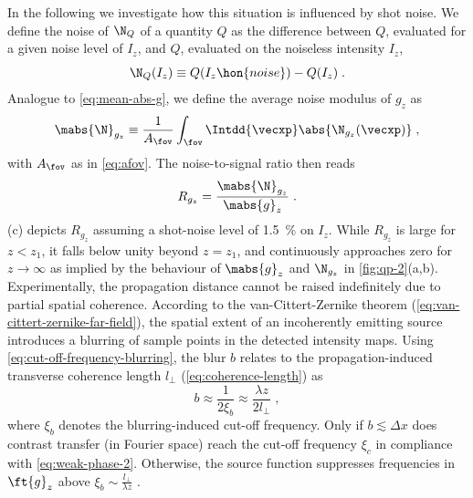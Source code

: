 \documentclass[
twoside,
openright,
titlepage,
numbers=noenddot,
headinclude,
fleqn,
a4paper,
footinclude=true,
cleardoublepage=empty,
abstractoff,
BCOR=5mm,
paper=a4,
fontsize=11pt,
british,ngerman,american,
]{scrreprt}
\begin{document}
In the following we investigate how this situation is influenced by
shot noise.  We define the noise of $\N_Q$ of a quantity $Q$ as the
difference between $Q$, evaluated for a given noise level of $I_z$,
and $Q$, evaluated on the noiseless intensity $I_z$,
\begin{equation}
  \label{eq:noise}
  \N_Q(I_z) \equiv Q(I_z\hon{noise}) - Q(I_z) \;.
\end{equation}
Analogue to \cref{eq:mean-abs-g}, we define the average noise modulus
of $g_z$ as
\begin{equation}
  \label{eq:mean-abs-noise}
  \mabs{\N}_{g_z} \equiv 
  \frac{1}{A_\fov} \int_{\fov}\Intdd{\vecxp}\abs{\N_{g_z}(\vecxp)} \;,
\end{equation}
with $A_\fov$ as in \cref{eq:afov}.  The noise-to-signal ratio then
reads
\begin{equation}
  \label{eq:nsr}
  R_{g_z} = \frac{\mabs{\N}_{g_z}}{\mabs{g}_z} \;.
\end{equation}
(c) depicts $R_{g_z}$ assuming a shot-noise level of
\SI{1.5}{\percent} on $I_z$.  While $R_{g_z}$ is large for $z<z_1$, it
falls below unity beyond $z=z_1$, and continuously approaches zero for
$z\to\infty$ as implied by the behaviour of $\mabs{g}_z$ and
$\N_{g_z}$ in \cref{fig:qp-2}(a,b).  Experimentally, the
propagation distance cannot be raised indefinitely due to partial
spatial coherence.  According to the van-Cittert-Zernike theorem
(\cref{eq:van-cittert-zernike-far-field}), the spatial extent of an
incoherently emitting source introduces a blurring of sample points in
the detected intensity maps.  Using
\cref{eq:cut-off-frequency-blurring}, the blur $b$ relates to the
propagation-induced transverse coherence length $l_\perp$
(\cref{eq:coherence-length}) as
\begin{equation}
  \label{eq:blur}
  b \approx \frac{1}{2\xi_b} \approx \frac{\lambda z}{2 l_\perp} \;,
\end{equation}
where $\xi_b$ denotes the blurring-induced cut-off frequency.  Only if
$b\lesssim \Delta x$ does contrast transfer (in Fourier space) reach
the cut-off frequency $\xi_c$ in compliance with
\cref{eq:weak-phase-2}.  Otherwise, the source function suppresses
frequencies in $\ft{g}_z$ above $\xi_b\sim\frac{l_\perp}{\lambda z}$
\cite{BornWolf,Wolf}.
\end{document}
